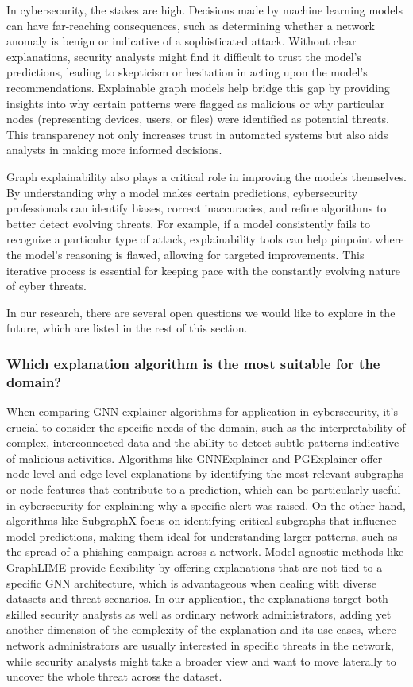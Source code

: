In cybersecurity, the stakes are high. Decisions made by machine learning models can have far-reaching consequences, such as determining whether a network anomaly is benign or indicative of a sophisticated attack. Without clear explanations, security analysts might find it difficult to trust the model's predictions, leading to skepticism or hesitation in acting upon the model's recommendations. Explainable graph models help bridge this gap by providing insights into why certain patterns were flagged as malicious or why particular nodes (representing devices, users, or files) were identified as potential threats. This transparency not only increases trust in automated systems but also aids analysts in making more informed decisions.

Graph explainability also plays a critical role in improving the models themselves. By understanding why a model makes certain predictions, cybersecurity professionals can identify biases, correct inaccuracies, and refine algorithms to better detect evolving threats. For example, if a model consistently fails to recognize a particular type of attack, explainability tools can help pinpoint where the model's reasoning is flawed, allowing for targeted improvements. This iterative process is essential for keeping pace with the constantly evolving nature of cyber threats.

In our research, there are several open questions we would like to explore in the future, which are listed in the rest of this section.

\subsubsection{Which explanation algorithm is the most suitable for the domain?}

When comparing GNN explainer algorithms for application in cybersecurity, it's crucial to consider the specific needs of the domain, such as the interpretability of complex, interconnected data and the ability to detect subtle patterns indicative of malicious activities. Algorithms like GNNExplainer and PGExplainer offer node-level and edge-level explanations by identifying the most relevant subgraphs or node features that contribute to a prediction, which can be particularly useful in cybersecurity for explaining why a specific alert was raised. On the other hand, algorithms like SubgraphX focus on identifying critical subgraphs that influence model predictions, making them ideal for understanding larger patterns, such as the spread of a phishing campaign across a network. Model-agnostic methods like GraphLIME provide flexibility by offering explanations that are not tied to a specific GNN architecture, which is advantageous when dealing with diverse datasets and threat scenarios. In our application, the explanations target both skilled security analysts as well as ordinary network administrators, adding yet another dimension of the complexity of the explanation and its use-cases, where network administrators are usually interested in specific threats in the network, while security analysts might take a broader view and want to move laterally to uncover the whole threat across the dataset.

